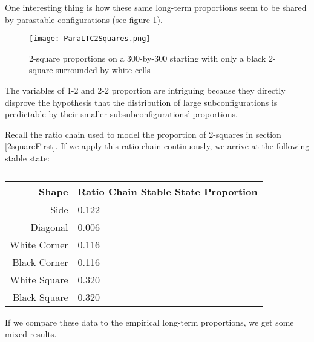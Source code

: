 \documentclass[12pt]{article}
\theoremstyle{definition}
\theoremstyle{remark}
\theoremstyle{remark}
\begin{document}
\par
One interesting thing is how these same long-term proportions seem to be shared by parastable configurations (see figure \ref{ParaLongTerm}).


\begin{figure}
  \label{ParaLongTerm}
  \centering
  \texttt{[image: ParaLTC2Squares.png]}
  \caption{2-square proportions on a 300-by-300 starting with only a black 2-square surrounded by white cells}
\end{figure}

\par
The variables of 1-2 and 2-2 proportion are intriguing because they directly disprove the hypothesis that the distribution of large subconfigurations is predictable by their smaller subsubconfigurations' proportions. %


\par
Recall the ratio chain used to model the proportion of 2-squares in section \ref{2squareFirst}. If we apply this ratio chain continuously, we arrive at the following stable state:
\begin{table}
\begin{tabular}{r|l}
  Shape & Ratio Chain Stable State Proportion \\ \hline
  Side & 0.122 \\
  Diagonal & 0.006 \\
  White Corner & 0.116 \\
  Black Corner & 0.116 \\
  White Square & 0.320 \\
  Black Square & 0.320 \\
\end{tabular}
\caption{}
\end{table}

\par
If we compare these data to the empirical long-term proportions, we get some mixed results.
\end{document}
